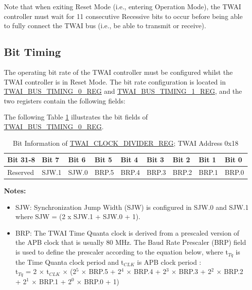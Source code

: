 \documentclass[main\_\_EN.tex]{subfiles}
\begin{document}
Note that when exiting Reset Mode (i.e., entering Operation Mode), the TWAI controller must wait for 11 consecutive Recessive bits to occur before being able to fully connect the TWAI bus (i.e., be able to transmit or receive).

\subsection{Bit Timing}
The operating bit rate of the TWAI controller must be configured whilst the TWAI controller is in Reset Mode. The bit rate configuration is located in \hyperref[regdesc:TWAIBUSTIMING0REG]{TWAI\_BUS\_TIMING\_0\_REG} and \hyperref[regdesc:TWAIBUSTIMING1REG]{TWAI\_BUS\_TIMING\_1\_REG}, and the two registers contain the following fields:

The following Table \ref{table:Bit_timing_0} illustrates the bit fields of \hyperref[regdesc:TWAIBUSTIMING0REG]{TWAI\_BUS\_TIMING\_0\_REG}.

\begin{longtable}[c]{|p{1.4cm}|p{1.4cm}|p{1.4cm}|p{1.4cm}|p{1.4cm}|p{1.4cm}|p{1.4cm}|p{1.4cm}|p{1.4cm}|}
\caption{Bit Information of \hyperref[regdesc:TWAICLOCKDIVIDERREG]{TWAI\_CLOCK\_DIVIDER\_REG}; TWAI Address 0x18}
\label{table:Bit_timing_0}\\\hline
\rowcolor{lightgray}
   Bit 31-8 & Bit 7 & Bit 6 & Bit 5 & Bit 4 & Bit 3 & Bit 2 & Bit 1 & Bit 0\\\hline
  Reserved & SJW.1 & SJW.0 & BRP.5 & BRP.4 & BRP.3 & BRP.2 & BRP.1 & BRP.0\\\hline
\end{longtable}
\vspace{-1.5em}
{\bfseries Notes:}\\
\begin{itemize}
    \item SJW: Synchronization Jump Width (SJW) is configured in SJW.0 and SJW.1 where SJW = (2 x SJW.1 + SJW.0 + 1).
    \item BRP: The TWAI Time Quanta clock is derived from a prescaled version of the APB clock that is usually 80 MHz. The Baud Rate Prescaler (BRP) field is used to define the prescaler according to the equation below, where t$_{Tq}$ is the Time Quanta clock period and t$_{CLK}$ is APB clock period :\\

t$_{Tq}$ = 2 × t$_{CLK}$ × (2$^{5}$ × BRP.5 + 2$^{4}$ × BRP.4 + 2$^{3}$ × BRP.3 + 2$^2$ × BRP.2 + 2$^1$ × BRP.1 + 2$^0$ × BRP.0 + 1)
\end{itemize}
\end{document}
